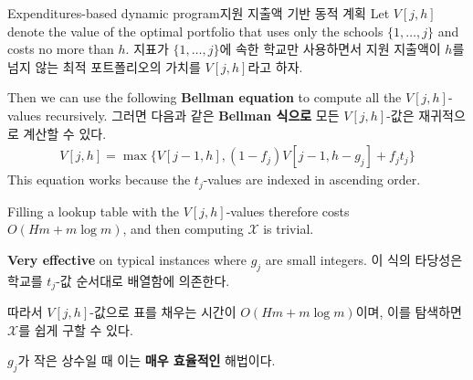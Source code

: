 \documentclass[11pt,mathserif,notheorems]{beamer}
\theoremstyle{definition}
\theoremstyle{definition}
\begin{document}
\begin{frame}{\ifen Expenditures-based dynamic program\else 지원 지출액 기반 동적 계획\fi}
\ifen Let $V[j,h] $ denote the value of the optimal portfolio that uses only the schools $\{ 1, \dots, j\}$ and costs no more than $h$.
\else 지표가 $\{ 1, \dots, j\}$에 속한 학교만 사용하면서 지원 지출액이 $h$를 넘지 않는 최적 포트폴리오의 가치를 $V[j, h]$라고 하자.\fi

\ifen Then we can use the following \textbf{Bellman equation} to compute all the $V[j, h]$-values recursively.
\else 그러면 다음과 같은 \textbf{Bellman 식으로} 모든 $V[j, h]$-값은 재귀적으로 계산할 수 있다. \fi
\begin{align*}
V[j, h] = \max\bigl\{ V[j-1, h], (1 - f_j) V[j-1, h-g_j] + f_j t_j \bigr\}
\end{align*}
\ifen
This equation works because the $t_j$-values are indexed in ascending order.

Filling a lookup table with the $V[j, h]$-values therefore costs $O(Hm + m\log m)$, and then computing $\mathcal{X}$ is trivial.

\textbf{Very effective} on typical instances where $g_j$ are small integers.
\else
이 식의 타당성은 학교를 $t_j$-값 순서대로 배열함에 의존한다.

따라서 $V[j, h]$-값으로 표를 채우는 시간이 $O(Hm + m\log m)$이며, 이를 탐색하면 $\mathcal{X}$를 쉽게 구할 수 있다.

$g_j$가 작은 상수일 때 이는 \textbf{매우 효율적인} 해법이다.
\fi
\end{frame}
\end{document}

